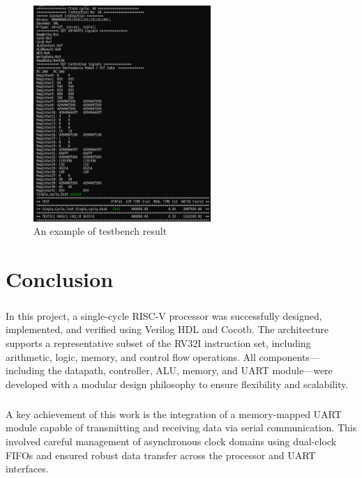 \documentclass[12pt]{report}
\begin{document}
\begin{figure}[h]
    \centering
    \includegraphics[width=0.6\textwidth]{figures/tb_result.png}
    \caption{An example of testbench result}
    \label{fig:tb result}
\end{figure}

\chapter{Conclusion}

\paragraph{}
In this project, a single-cycle RISC-V processor was successfully designed, implemented, and verified using Verilog HDL and Cocotb. The architecture supports a representative subset of the RV32I instruction set, including arithmetic, logic, memory, and control flow operations. All components—including the datapath, controller, ALU, memory, and UART module—were developed with a modular design philosophy to ensure flexibility and scalability.

\paragraph{}
A key achievement of this work is the integration of a memory-mapped UART module capable of transmitting and receiving data via serial communication. This involved careful management of asynchronous clock domains using dual-clock FIFOs and ensured robust data transfer across the processor and UART interfaces.
\end{document}
